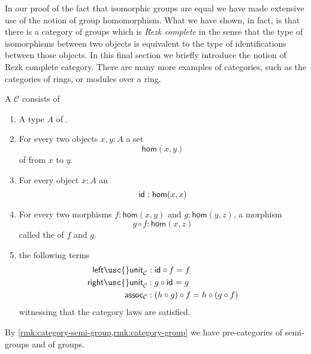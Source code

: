 In our proof of the fact that isomorphic groups are equal we have made extensive use of the notion of group homomorphism. What we have shown, in fact, is that there is a category of groups which is \emph{Rezk complete} in the sense that the type of isomorphisms between two objects is equivalent to the type of identifications between those objects. In this final section we briefly introduce the notion of Rezk complete category. There are many more examples of categories, such as the categories of rings, or modules over a ring.

\begin{defn}
  A  $\mathcal{C}$ consists of
  \begin{enumerate}
  \item A type $A$ of .
  \item For every two objects $x,y:A$ a set
    \begin{equation*}
      \mathsf{hom}(x,y)
    \end{equation*}
    of  from $x$ to $y$.
  \item For every object $x:A$ an 
    \begin{equation*}
      \mathsf{id}_{} : \mathsf{hom}(x,x)
    \end{equation*}
  \item For every two morphisms $f:\mathsf{hom}(x,y)$ and $g:\mathsf{hom}(y,z)$, a morphism
    \begin{equation*}
      g\circ f :\mathsf{hom}(x,z)
    \end{equation*}
    called the  of $f$ and $g$.
  \item the following terms
    \begin{align*}
      \mathsf{left\usc{}unit}_{\mathcal{C}} & : \idfunc \circ f = f \\
      \mathsf{right\usc{}unit}_{\mathcal{C}} & : g \circ \idfunc = g \\
      \mathsf{assoc}_{\mathcal{C}} & : (h \circ g) \circ f = h \circ (g \circ f)
    \end{align*}
    witnessing that the category laws are satisfied.
  \end{enumerate}
\end{defn}

\begin{eg}
  By \cref{rmk:category-semi-group,rmk:category-group} we have pre-categories of semi-groups and of groups.
\end{eg}

